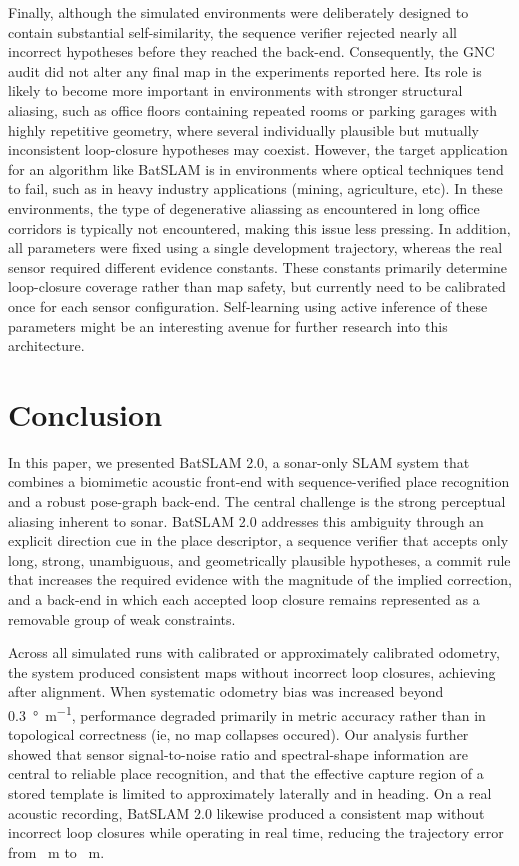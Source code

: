 Finally, although the simulated environments were deliberately designed to contain substantial self-similarity, the sequence verifier rejected nearly all incorrect hypotheses before they reached the back-end. Consequently, the GNC audit did not alter any final map in the experiments reported here. Its role is likely to become more important in environments with stronger structural aliasing, such as office floors containing repeated rooms or parking garages with highly repetitive geometry, where several individually plausible but mutually inconsistent loop-closure hypotheses may coexist. However, the target application for an algorithm like BatSLAM is in environments where optical techniques tend to fail, such as in heavy industry applications (mining, agriculture, etc). In these environments, the type of degenerative aliassing as encountered in long office corridors is typically not encountered, making this issue less pressing. In addition, all parameters were fixed using a single development trajectory, whereas the real sensor required different evidence constants. These constants primarily determine loop-closure coverage rather than map safety, but currently need to be calibrated once for each sensor configuration. Self-learning using active inference of these parameters might be an interesting avenue for further research into this architecture.

\section{Conclusion}
\label{sec:conclusion}

In this paper, we presented BatSLAM 2.0, a sonar-only SLAM system that combines a biomimetic acoustic front-end with sequence-verified place recognition and a robust pose-graph back-end. The central challenge is the strong perceptual aliasing inherent to sonar. BatSLAM 2.0 addresses this ambiguity through an explicit direction cue in the place descriptor, a sequence verifier that accepts only long, strong, unambiguous, and geometrically plausible hypotheses, a commit rule that increases the required evidence with the magnitude of the implied correction, and a back-end in which each accepted loop closure remains represented as a removable group of weak constraints.

Across all \NdesRuns{} simulated runs with calibrated or approximately calibrated odometry, the system produced consistent maps without incorrect loop closures, achieving \ATEalignedDesRange{} after alignment. When systematic odometry bias was increased beyond \SI{0.3}{\degree\per\meter}, performance degraded primarily in metric accuracy rather than in topological correctness (ie, no map collapses occured). Our analysis further showed that sensor signal-to-noise ratio and spectral-shape information are central to reliable place recognition, and that the effective capture region of a stored template is limited to approximately \CaptureLateral{} laterally and \CaptureHeading{} in heading. On a real acoustic recording, BatSLAM 2.0 likewise produced a consistent map without incorrect loop closures while operating in real time, reducing the trajectory error from \RealATEodo{}~\si{\meter} to \RealATEEven{}~\si{\meter}.

